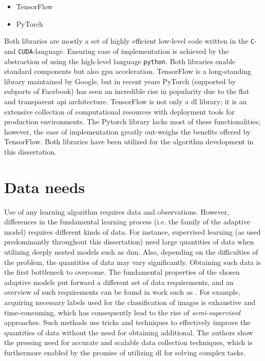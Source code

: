 \begin{itemize}
    \item TensorFlow \cite{tensorflow2015-whitepaper}
    \item PyTorch \cite{Paszke2017AutomaticPyTorch}
\end{itemize}

Both libraries are mostly a set of highly efficient low-level code written in the \texttt{C}- and \texttt{CUDA}-language. Ensuring ease of implementation is achieved by the abstraction of using the high-level language \texttt{python}. Both libraries enable standard components but also \gls{gpu} acceleration. TensorFlow is a long-standing library maintained by Google, but in recent years PyTorch (supported by subparts of Facebook) has seen an incredible rise in popularity due to the flat and transparent \gls{api} architecture. TensorFlow is not only a \gls{dl} library; it is an extensive collection of computational resources with deployment tools for production environments. The Pytorch library lacks most of these functionalities; however, the ease of implementation greatly out-weighs the benefits offered by TensorFlow. Both libraries have been utilized for the algorithm development in this dissertation. 

\section{Data needs}

Use of any learning algorithm requires data and observations. However, differences in the fundamental learning process (i.e. the family of the adaptive model) requires different kinds of data. For instance, supervised learning (as used predominantly throughout this dissertation) need large quantities of data when utilizing deeply nested models such as \gls{dnn}. Also, depending on the difficulties of the problem, the quantities of data may vary significantly. Obtaining such data is the first bottleneck to overcome. The fundamental properties of the chosen adaptive models put forward a different set of data requirements, and an overview of such requirements can be found in work such as \cite{RohAPerspective}. For example, acquiring necessary labels used for the classification of images is exhaustive and time-consuming, which has consequently lead to the rise of \emph{semi-supervised} approaches. Such methods use tricks and techniques to effectively improve the quantities of data without the need for obtaining additional. The authors show the pressing need for accurate and scalable data collection techniques, which is furthermore enabled by the promise of utilizing \gls{dl} for solving complex tasks. 

